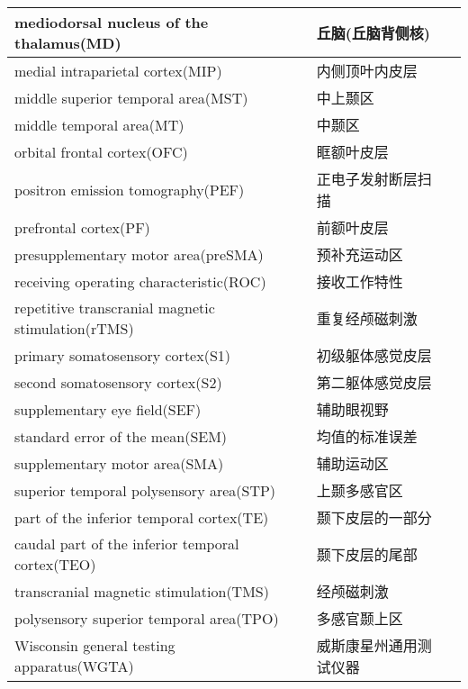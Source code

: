 \begin{table}[htbp]
{\begin{tabular}{llll}
        \midrule
        mediodorsal nucleus of the thalamus(MD)      &&丘脑(丘脑背侧核)   \\
        \midrule
        medial intraparietal cortex(MIP)      &&内侧顶叶内皮层   \\
        \midrule
        middle superior temporal area(MST)     &&中上颞区   \\
        \midrule
        middle temporal area(MT)       &&中颞区   \\
        \midrule
        orbital frontal cortex(OFC)       &&眶额叶皮层   \\
        \midrule
        positron emission tomography(PEF)       &&正电子发射断层扫描   \\
        \midrule
        prefrontal cortex(PF)       &&前额叶皮层   \\
        \midrule
        presupplementary motor area(preSMA)       &&预补充运动区   \\
        \midrule
        receiving operating characteristic(ROC)       &&接收工作特性   \\
        \midrule
        repetitive transcranial magnetic stimulation(rTMS)      &&重复经颅磁刺激   \\
        \midrule
        primary somatosensory cortex(S1)      &&初级躯体感觉皮层   \\
        \midrule
        second somatosensory cortex(S2)      &&第二躯体感觉皮层   \\
        \midrule
        supplementary eye field(SEF)      &&辅助眼视野   \\
        \midrule
        standard error of the mean(SEM)      &&均值的标准误差   \\
        \midrule
        supplementary motor area(SMA)      &&辅助运动区   \\
        \midrule
        superior temporal polysensory area(STP)      &&上颞多感官区   \\
        \midrule
        part of the inferior temporal cortex(TE)     &&颞下皮层的一部分   \\
        \midrule
        caudal part of the inferior temporal cortex(TEO)      &&颞下皮层的尾部   \\
        \midrule
        transcranial magnetic stimulation(TMS)     &&经颅磁刺激   \\
        \midrule
        polysensory superior temporal area(TPO)      &&多感官颞上区   \\
        \midrule
        Wisconsin general testing apparatus(WGTA)      &&威斯康星州通用测试仪器   \\


		\bottomrule  

	\end{tabular}}
    \end{table}%